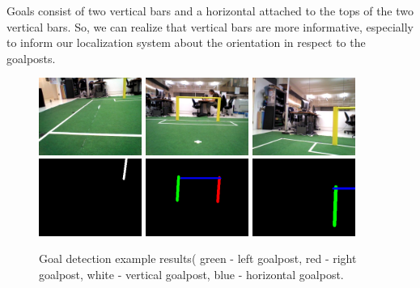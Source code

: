 \documentclass[	DIV=calc,%
							paper=a4,%
							fontsize=9pt,%
							twocolumn]{scrartcl}	 					%
\begin{document}
Goals consist of two vertical bars and a horizontal attached to the tops of the two vertical bars. So, we can realize that vertical bars are more informative, especially to inform our localization system about the orientation in respect to the goalposts.

\begin{figure}[t!]
\caption{Goal detection example results( green - left goalpost, red - right goalpost, white - vertical goalpost, blue - horizontal goalpost.}
\label{posts}
\centering    
\includegraphics[width=0.3\textwidth]{figures/img_000003.jpg}	
\includegraphics[width=0.3\textwidth]{figures/img_000005.jpg}	
\includegraphics[width=0.3\textwidth]{figures/img_000006.jpg} \\
\includegraphics[width=0.3\textwidth]{figures/post3.png}
\includegraphics[width=0.3\textwidth]{figures/post5.png}
\includegraphics[width=0.3\textwidth]{figures/post6.png}
\end{figure}
\end{document}
